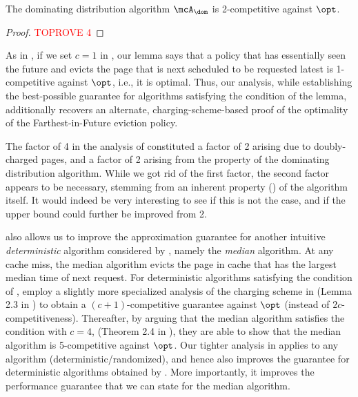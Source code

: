 \documentclass[11pt]{article}
\begin{document}
\begin{corollary}
    \label{corollary:dom-is-2-competitive}
    The dominating distribution algorithm $\mcA_\dom$ is 2-competitive against $\opt$.
\end{corollary}
\begin{proof}\textcolor{red}{TOPROVE 4}\end{proof}

\begin{remark}
    \label{remark:optimal-fifo}
    As in , if we set $c=1$ in , our lemma says that a policy that has essentially seen the future and evicts the page that is next scheduled to be requested latest is 1-competitive against $\opt$, i.e., it is optimal. Thus, our analysis, while establishing the best-possible guarantee for algorithms satisfying the condition of the lemma, additionally recovers an alternate, charging-scheme-based proof of the optimality of the Farthest-in-Future eviction policy.
\end{remark}

\begin{remark}
    \label{remark:2-correct-answer-for-dom}
    The factor of 4 in the analysis of \cite{lund1994ip} constituted a factor of 2 arising due to doubly-charged pages, and a factor of 2 arising from the property of the dominating distribution algorithm. While we got rid of the first factor, the second factor appears to be necessary, stemming from an inherent property () of the algorithm itself. It would indeed be very interesting to see if this is not the case, and if the upper bound could further be improved from 2.
\end{remark}

 also allows us to improve the approximation guarantee for another intuitive \textit{deterministic} algorithm considered by \cite{lund1999paging}, namely the \textit{median} algorithm. At any cache miss, the median algorithm evicts the page in cache that has the largest median time of next request. For deterministic algorithms satisfying the condition of , \cite{lund1999paging} employ a slightly more specialized analysis of the charging scheme in  (Lemma 2.3 in \cite{lund1999paging}) to obtain a $(c+1)$-competitive guarantee against $\opt$ (instead of $2c$-competitiveness). Thereafter, by arguing that the median algorithm satisfies the condition with $c=4$, (Theorem 2.4 in \cite{lund1999paging}), they are able to show that the median algorithm is 5-competitive against $\opt$. Our tighter analysis in  applies to any algorithm (deterministic/randomized), and hence also improves the guarantee for deterministic algorithms obtained by \cite{lund1999paging}. More importantly, it improves the performance guarantee that we can state for the median algorithm.
\end{document}
